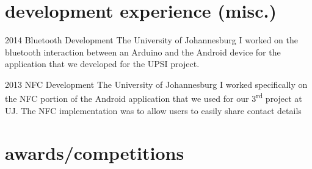 \documentclass[]{friggeri-cv} %
\begin{document}

\newpage

\section{development experience (misc.)}

\begin{entrylist}
\entry
{2014}
{Bluetooth Development}
{The University of Johannesburg}
{I worked on the bluetooth interaction between an Arduino and the Android device for the application that we developed for the UPSI project.}

\entry
{2013}
{NFC Development}
{The University of Johannesburg}
{I worked specifically on the NFC portion of the Android application that we used for our 3\textsuperscript{rd} project at UJ. The NFC implementation was to allow users to easily share contact details}

\end{entrylist}


\section{awards/competitions}
\end{document}

